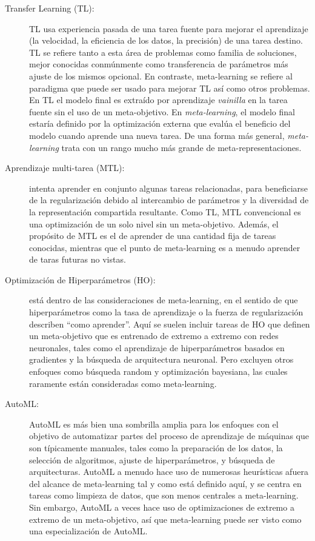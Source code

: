 \begin{description}
	\item[Transfer Learning (TL):] TL usa experiencia pasada de una tarea fuente para mejorar el aprendizaje (la velocidad, la eficiencia de los datos, la precisión) de una tarea destino. TL se refiere tanto a esta área de problemas como familia de soluciones, mejor conocidas conmúnmente como transferencia de parámetros más ajuste de los mismos opcional. En contraste, meta-learning se refiere al paradigma que puede ser usado para mejorar TL así como otros problemas. En TL el modelo final es extraído por aprendizaje \textit{vainilla} en la tarea fuente sin el uso de un meta-objetivo. En \emph{meta-learning}, el modelo final estaría definido por la optimización externa que evalúa el beneficio del modelo cuando aprende una nueva tarea. De una forma más general, \emph{meta-learning} trata con un rango mucho más grande de meta-representaciones.
	\item[Aprendizaje multi-tarea (MTL):] intenta aprender en conjunto algunas tareas relacionadas, para beneficiarse de la regularización debido al intercambio de parámetros y la diversidad de la representación compartida resultante. Como TL, MTL convencional es una optimización de un solo nivel sin un meta-objetivo. Además, el propósito de MTL es el de aprender de una cantidad fija de tareas conocidas, mientras que el punto de meta-learning es a menudo aprender de taras futuras no vistas. 
	\item[Optimización de Hiperparámetros (HO):] está dentro de las consideraciones de meta-learning, en el sentido de que hiperparámetros como la tasa de aprendizaje o la fuerza de regularización describen “como aprender”. Aquí se suelen incluir tareas de HO que definen un meta-objetivo que es entrenado de extremo a extremo con redes neuronales, tales como el aprendizaje de hiperparámetros basados en gradientes y la búsqueda de arquitectura neuronal. Pero excluyen otros enfoques como búsqueda random y optimización bayesiana, las cuales raramente están consideradas como meta-learning.
	\item[AutoML:] AutoML es más bien una sombrilla amplia para los enfoques con el objetivo de automatizar partes del proceso de aprendizaje de máquinas que son típicamente manuales, tales como la preparación de los datos, la selección de algoritmos, ajuste de hiperparámetros, y búsqueda de arquitecturas. AutoML a menudo hace uso de numerosas heurísticas afuera del alcance de meta-learning tal y como está definido aquí, y se centra en tareas como limpieza de datos, que son menos centrales a meta-learning. Sin embargo, AutoML a veces hace uso de optimizaciones de extremo a extremo de un meta-objetivo, así que meta-learning puede ser visto como una especialización de AutoML.
\end{description}

